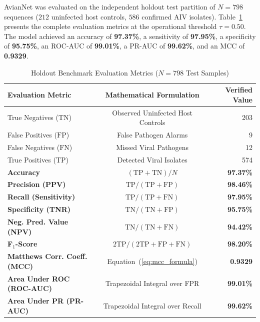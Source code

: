 \documentclass[conference]{IEEEtran}
\begin{document}
AvianNet was evaluated on the independent holdout test partition of $N = 798$ sequences ($212$ uninfected host controls, $586$ confirmed AIV isolates). Table~\ref{tab:test_metrics} presents the complete evaluation metrics at the operational threshold $\tau = 0.50$. The model achieved an accuracy of \textbf{97.37\%}, a sensitivity of \textbf{97.95\%}, a specificity of \textbf{95.75\%}, an ROC-AUC of \textbf{99.01\%}, a PR-AUC of \textbf{99.62\%}, and an MCC of \textbf{0.9329}.

\begin{table}[t]
  \centering
  \caption{Holdout Benchmark Evaluation Metrics ($N = 798$ Test Samples)}
  \label{tab:test_metrics}
  \begin{tabular}{lcr}
    \toprule
    \textbf{Evaluation Metric} & \textbf{Mathematical Formulation} & \textbf{Verified Value} \\
    \midrule
    True Negatives ($\text{TN}$) & Observed Uninfected Host Controls & 203 \\
    False Positives ($\text{FP}$) & False Pathogen Alarms & 9 \\
    False Negatives ($\text{FN}$) & Missed Viral Pathogens & 12 \\
    True Positives ($\text{TP}$) & Detected Viral Isolates & 574 \\
    \midrule
    \textbf{Accuracy} & $(\text{TP} + \text{TN}) / N$ & \textbf{97.37\%} \\
    \textbf{Precision (PPV)} & $\text{TP} / (\text{TP} + \text{FP})$ & \textbf{98.46\%} \\
    \textbf{Recall (Sensitivity)} & $\text{TP} / (\text{TP} + \text{FN})$ & \textbf{97.95\%} \\
    \textbf{Specificity (TNR)} & $\text{TN} / (\text{TN} + \text{FP})$ & \textbf{95.75\%} \\
    \textbf{Neg. Pred. Value (NPV)} & $\text{TN} / (\text{TN} + \text{FN})$ & \textbf{94.42\%} \\
    \textbf{F$_1$-Score} & $2\text{TP} / (2\text{TP} + \text{FP} + \text{FN})$ & \textbf{98.20\%} \\
    \textbf{Matthews Corr. Coeff. (MCC)} & Equation~(\ref{eq:mcc_formula}) & \textbf{0.9329} \\
    \midrule
    \textbf{Area Under ROC (ROC-AUC)} & Trapezoidal Integral over FPR & \textbf{99.01\%} \\
    \textbf{Area Under PR (PR-AUC)} & Trapezoidal Integral over Recall & \textbf{99.62\%} \\
    \bottomrule
  \end{tabular}
\end{table}
\end{document}
